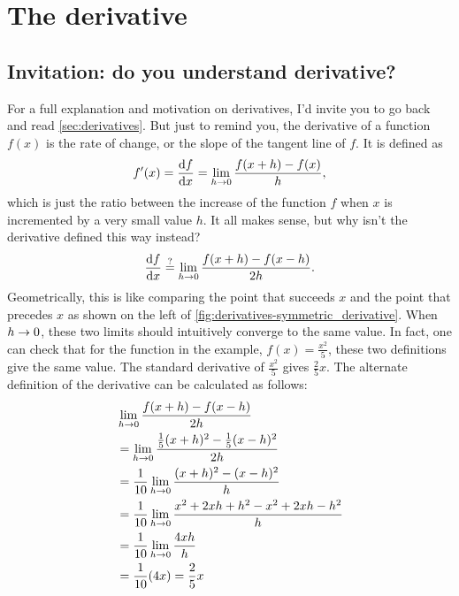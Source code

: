 \chapter{The derivative}

\section{Invitation: do you understand derivative?}

For a full explanation and motivation on derivatives, I'd invite you to go back and read \cref{sec:derivatives}. But just to remind you, the derivative of a function \(f(x)\) is the rate of change, or the slope of the tangent line of \(f\). It is defined as
\begin{equation}
  f'(x) = \odv{f}{x} = \lim_{h \appr 0} \frac{f(x + h) - f(x)}{h},
\end{equation}
which is just the ratio between the increase of the function \(f\) when \(x\) is incremented by a very small value \(h\). It all makes sense, but why isn't the derivative defined this way instead?
\begin{equation}
  \odv{f}{x} \overset{?}{=} \lim_{h \appr 0} \frac{f(x + h) - f(x - h)}{2h}.
\end{equation}
Geometrically, this is like comparing the point that succeeds \(x\) and the point that precedes \(x\) as shown on the left of \cref{fig:derivatives-symmetric_derivative}. When \(h \rightarrow 0\), these two limits should intuitively converge to the same value. In fact, one can check that for the function in the example, \(f(x) = \frac{x^2}{5}\), these two definitions give the same value. The standard derivative of \(\frac{x^2}{5}\) gives \(\frac{2}{5}x\). The alternate definition of the derivative can be calculated as follows:
\begin{align}
   & \lim_{h \rightarrow 0} \frac{f(x + h) - f(x - h)}{2h}                             \\
   & = \lim_{h \rightarrow 0} \frac{\frac{1}{5}(x + h)^2 - \frac{1}{5}(x - h)^2}{2h}   \\
   & = \frac{1}{10} \lim_{h \rightarrow 0} \frac{(x + h)^2 - (x - h)^2}{h}             \\
   & = \frac{1}{10} \lim_{h \rightarrow 0} \frac{x^2 + 2xh + h^2 - x^2 + 2xh - h^2}{h} \\
   & = \frac{1}{10} \lim_{h \rightarrow 0} \frac{4xh}{h}                               \\
   & = \frac{1}{10}(4x) = \frac{2}{5}x
\end{align}

